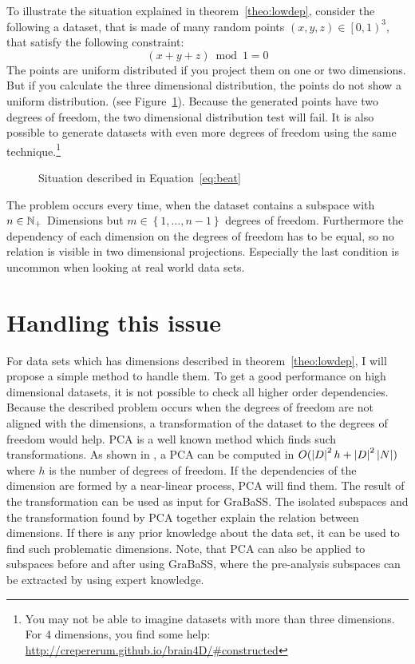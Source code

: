 To illustrate the situation explained in theorem~\ref{theo:lowdep}, consider the following a dataset, that is made of many random points $(x, y, z) \in \left[0, 1\right)^3$, that satisfy the following constraint:
\begin{equation}\label{eq:beat}
	(x + y + z) \bmod 1 = 0
\end{equation}
The points are uniform distributed if you project them on one or two dimensions. But if you calculate the three dimensional distribution, the points do not show a uniform distribution. (see Figure~\ref{fig:beat}). Because the generated points have two degrees of freedom, the two dimensional distribution test will fail. It is also possible to generate datasets with even more degrees of freedom using the same technique.\footnote{You may not be able to imagine datasets with more than three dimensions. For 4 dimensions, you find some help: \url{http://crepererum.github.io/brain4D/\#constructed}}
\begin{figure}
	\caption{Situation described in Equation~\ref{eq:beat}}
	\label{fig:beat}
	\hfill
	\hfill
	\hfill
\end{figure}

The problem occurs every time, when the dataset contains a subspace with $n \in \mathbb{N}_+$ Dimensions but $m \in \left\{1,\dots,n-1\right\}$ degrees of freedom. Furthermore the dependency of each dimension on the degrees of freedom has to be equal, so no relation is visible in two dimensional projections. Especially the last condition is uncommon when looking at real world data sets.

\section{Handling this issue}
For data sets which has dimensions described in theorem~\ref{theo:lowdep}, I will propose a simple method to handle them. To get a good performance on high dimensional datasets, it is not possible to check all higher order dependencies. Because the described problem occurs when the degrees of freedom are not aligned with the dimensions, a transformation of the dataset to the degrees of freedom would help. PCA is a well known method which finds such transformations. As shown in \cite{journals/prl/SharmaP07}, a PCA can be computed in $O ( \left|D\right|^2h + \left|D\right|^2\left|N\right| )$ where $h$ is the number of degrees of freedom. If the dependencies of the dimension are formed by a near-linear process, PCA will find them. The result of the transformation can be used as input for GraBaSS. The isolated subspaces and the transformation found by PCA together explain the relation between dimensions. If there is any prior knowledge about the data set, it can be used to find such problematic dimensions. Note, that PCA can also be applied to subspaces before and after using GraBaSS, where the pre-analysis subspaces can be extracted by using expert knowledge.


